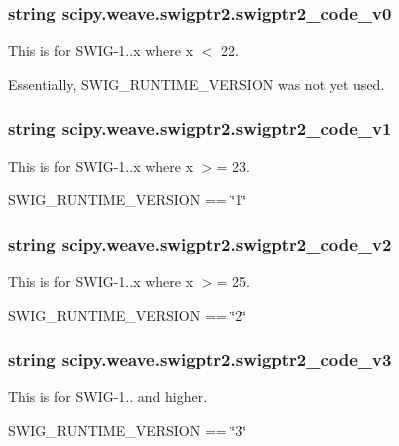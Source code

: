 \subsubsection[{swigptr2\+\_\+code\+\_\+v0}]{\setlength{\rightskip}{0pt plus 5cm}string scipy.\+weave.\+swigptr2.\+swigptr2\+\_\+code\+\_\+v0}\label{namespacescipy_1_1weave_1_1swigptr2_a585fc46b8f63180b0b9fd2d530d6f3b2}


This is for S\+W\+I\+G-\/1..\+x where x $<$ 22. 

Essentially, S\+W\+I\+G\+\_\+\+R\+U\+N\+T\+I\+M\+E\+\_\+\+V\+E\+R\+S\+I\+O\+N was not yet used. \hypertarget{namespacescipy_1_1weave_1_1swigptr2_a8c9c1a3786b0cb399218ee598f5a2cf4}{}
\subsubsection[{swigptr2\+\_\+code\+\_\+v1}]{\setlength{\rightskip}{0pt plus 5cm}string scipy.\+weave.\+swigptr2.\+swigptr2\+\_\+code\+\_\+v1}\label{namespacescipy_1_1weave_1_1swigptr2_a8c9c1a3786b0cb399218ee598f5a2cf4}


This is for S\+W\+I\+G-\/1..\+x where x $>$= 23. 

S\+W\+I\+G\+\_\+\+R\+U\+N\+T\+I\+M\+E\+\_\+\+V\+E\+R\+S\+I\+O\+N == \char`\"{}1\char`\"{} \hypertarget{namespacescipy_1_1weave_1_1swigptr2_a2babf5d3e5646c536cc17176f25a9406}{}
\subsubsection[{swigptr2\+\_\+code\+\_\+v2}]{\setlength{\rightskip}{0pt plus 5cm}string scipy.\+weave.\+swigptr2.\+swigptr2\+\_\+code\+\_\+v2}\label{namespacescipy_1_1weave_1_1swigptr2_a2babf5d3e5646c536cc17176f25a9406}


This is for S\+W\+I\+G-\/1..\+x where x $>$= 25. 

S\+W\+I\+G\+\_\+\+R\+U\+N\+T\+I\+M\+E\+\_\+\+V\+E\+R\+S\+I\+O\+N == \char`\"{}2\char`\"{} \hypertarget{namespacescipy_1_1weave_1_1swigptr2_a4fcb47cac914b3c64e18859185d24571}{}
\subsubsection[{swigptr2\+\_\+code\+\_\+v3}]{\setlength{\rightskip}{0pt plus 5cm}string scipy.\+weave.\+swigptr2.\+swigptr2\+\_\+code\+\_\+v3}\label{namespacescipy_1_1weave_1_1swigptr2_a4fcb47cac914b3c64e18859185d24571}


This is for S\+W\+I\+G-\/1.. and higher. 

S\+W\+I\+G\+\_\+\+R\+U\+N\+T\+I\+M\+E\+\_\+\+V\+E\+R\+S\+I\+O\+N == \char`\"{}3\char`\"{} 
